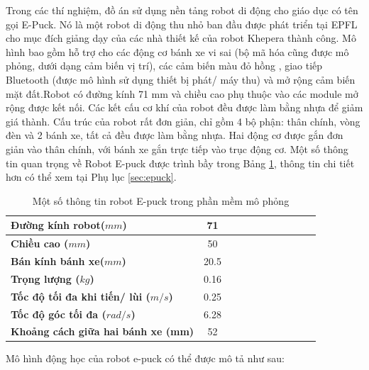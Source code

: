 Trong các thí nghiệm, đồ án sử dụng nền tảng robot di động cho giáo dục có tên gọi E-Puck. Nó là một robot di động thu nhỏ ban đầu được phát triển tại EPFL cho mục đích giảng dạy của các nhà thiết kế của robot Khepera thành công. Mô hình bao gồm hỗ trợ cho các động cơ bánh xe vi sai (bộ mã hóa cũng được mô phỏng, dưới dạng cảm biến vị trí), các cảm biến màu đỏ hồng , giao tiếp Bluetooth (được mô hình sử dụng thiết bị phát/ máy thu) và mở rộng cảm biến mặt đất.Robot có đường kính 71 mm và chiều cao phụ thuộc vào các module mở rộng được kết nối. Các kết cấu cơ khí của robot đều được làm bằng nhựa để giảm giá thành. Cấu trúc của robot rất đơn giản, chỉ gồm 4 bộ phận: thân chính, vòng đèn và 2 bánh xe, tất cả đều được làm bằng nhựa. Hai động cơ được gắn đơn giản vào thân chính, với bánh xe gắn trực tiếp vào trục động cơ. Một số thông tin quan trọng về Robot E-puck được trình bầy trong Bảng \ref{tab:Scoverage}, thông tin chi tiết hơn có thể xem tại Phụ lục \ref{sec:epuck}.
\begin{table}[h]
\centering
\caption{Một số thông tin robot E-puck trong phần mềm mô phỏng}
\label{tab:Scoverage}
\begin{tabular}{|l|c|c|c|c|c|c|c|c|c|c|}
\hline
\textbf{Đường kính robot($mm$)}      & 71  \\ \hline
\textbf{Chiều cao ($mm$)} & 50        \\ \hline
\textbf{Bán kính bánh xe($mm$)}      & 20.5  \\ \hline
\textbf{Trọng lượng ($kg$)} & 0.16        \\ \hline
\textbf{Tốc độ tối đa khi tiến/ lùi ($m/s$)} & 0.25       \\ \hline
\textbf{Tốc độ góc tối đa ($rad/s$)} & 6.28       \\ \hline
\textbf{Khoảng cách giữa hai bánh xe (mm)} & 52       \\ \hline
\end{tabular}
\end{table}

Mô hình động học của robot e-puck có thể được mô tả như sau: 
 
